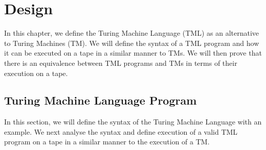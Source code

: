 \chapter{Design}
In this chapter, we define the Turing Machine Language (TML) as an alternative to Turing Machines (TM). We will define the syntax of a TML program and how it can be executed on a tape in a similar manner to TMs. We will then prove that there is an equivalence between TML programs and TMs in terms of their execution on a tape.

\section{Turing Machine Language Program}
In this section, we will define the syntax of the Turing Machine Language with an example. We next analyse the syntax and define execution of a valid TML program on a tape in a similar manner to the execution of a TM.

